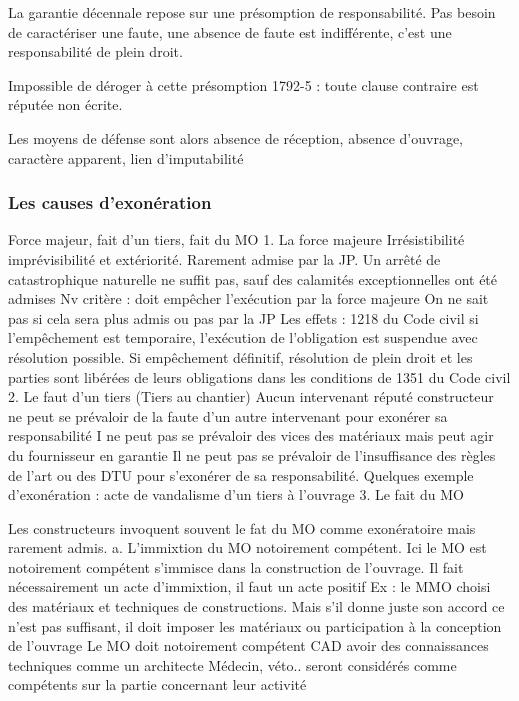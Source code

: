 		La garantie décennale repose sur une présomption de responsabilité. Pas besoin de caractériser une faute, une absence de faute est indifférente, c’est une responsabilité de plein droit.

		Impossible de déroger à cette présomption 1792-5 : toute clause contraire est réputée non écrite.

		Les moyens de défense sont alors absence de réception, absence d’ouvrage, caractère apparent, lien d’imputabilité


		\subsubsection{Les causes d'exonération}

		Force majeur, fait d’un tiers, fait du MO
		1.	La force majeure
		Irrésistibilité imprévisibilité et extériorité. Rarement admise par la JP. Un arrêté de catastrophique naturelle ne suffit pas, sauf des calamités exceptionnelles ont été admises
		Nv critère : doit empêcher l’exécution par la force majeure On ne sait pas si cela sera plus admis ou pas par la JP
		Les effets : 1218 du Code civil si l’empêchement est temporaire, l’exécution de l’obligation est suspendue avec résolution possible. Si empêchement définitif, résolution de plein droit et les parties sont libérées de leurs obligations dans les conditions de 1351 du Code civil
		2.	Le faut d’un tiers (Tiers au chantier)
		Aucun intervenant réputé constructeur ne peut se prévaloir de la faute d’un autre intervenant pour exonérer sa responsabilité
		I ne peut pas se prévaloir des vices des matériaux mais peut agir du fournisseur en garantie
		Il ne peut pas se prévaloir de l’insuffisance des règles de l’art ou des DTU pour s’exonérer de sa responsabilité.
		Quelques exemple d’exonération : acte de vandalisme d’un tiers à l’ouvrage
		3.	Le fait du MO

		Les constructeurs invoquent souvent le fat du MO comme exonératoire mais rarement admis.
		a.	L’immixtion du MO notoirement compétent.
		Ici le MO est notoirement compétent s’immisce dans la construction de l’ouvrage.
		Il fait nécessairement un acte d’immixtion, il faut un acte positif
		Ex : le MMO choisi des matériaux et techniques de constructions. Mais s’il donne juste son accord ce n’est pas suffisant, il doit imposer les matériaux ou participation à la conception de l’ouvrage
		Le MO doit notoirement compétent CAD avoir des connaissances techniques comme un architecte
		Médecin, véto.. seront considérés comme compétents sur la partie concernant leur activité

